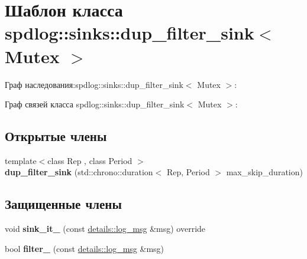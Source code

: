 \hypertarget{classspdlog_1_1sinks_1_1dup__filter__sink}{}\section{Шаблон класса spdlog\+:\+:sinks\+:\+:dup\+\_\+filter\+\_\+sink$<$ Mutex $>$}
\label{classspdlog_1_1sinks_1_1dup__filter__sink}


Граф наследования\+:spdlog\+:\+:sinks\+:\+:dup\+\_\+filter\+\_\+sink$<$ Mutex $>$\+:


Граф связей класса spdlog\+:\+:sinks\+:\+:dup\+\_\+filter\+\_\+sink$<$ Mutex $>$\+:
\subsection*{Открытые члены}
\begin{DoxyCompactItemize}
\item 
\mbox{\label{classspdlog_1_1sinks_1_1dup__filter__sink_a3a9b6c4119c6c02b945dd33597b3f4f2}} 
{\footnotesize template$<$class Rep , class Period $>$ }\\{\bfseries dup\+\_\+filter\+\_\+sink} (std\+::chrono\+::duration$<$ Rep, Period $>$ max\+\_\+skip\+\_\+duration)
\end{DoxyCompactItemize}
\subsection*{Защищенные члены}
\begin{DoxyCompactItemize}
\item 
\mbox{\label{classspdlog_1_1sinks_1_1dup__filter__sink_ab9a9a6ecfed80a9d8739e06d4d1aec03}} 
void {\bfseries sink\+\_\+it\+\_\+} (const \hyperlink{structspdlog_1_1details_1_1log__msg}{details\+::log\+\_\+msg} \&msg) override
\item 
\mbox{\label{classspdlog_1_1sinks_1_1dup__filter__sink_a47d980d8a3671b63fabb163dd0fbb542}} 
bool {\bfseries filter\+\_\+} (const \hyperlink{structspdlog_1_1details_1_1log__msg}{details\+::log\+\_\+msg} \&msg)
\end{DoxyCompactItemize}
